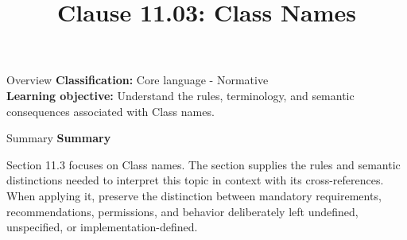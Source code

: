 \documentclass[10pt,letterpaper]{article}
\title{Clause 11.03: Class Names}
\author{}
\date{}
\begin{document}
\maketitle
\begin{CornellOverviewBox}{Overview}
\textbf{Classification:} Core language - Normative\\[2pt]
\textbf{Learning objective:} Understand the rules, terminology, and semantic consequences associated with Class names.
\end{CornellOverviewBox}\begin{CornellSummaryBox}{Summary}
{\sffamily\bfseries\color{Accent} Summary}\par\vspace{3pt}Section 11.3 focuses on Class names. The section supplies the rules and semantic distinctions needed to interpret this topic in context with its cross-references. When applying it, preserve the distinction between mandatory requirements, recommendations, permissions, and behavior deliberately left undefined, unspecified, or implementation-defined.
\end{CornellSummaryBox}
\end{document}
